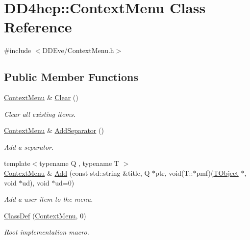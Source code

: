 \hypertarget{class_d_d4hep_1_1_context_menu}{
\section{DD4hep::ContextMenu Class Reference}
\label{class_d_d4hep_1_1_context_menu}
}


{\ttfamily \#include $<$DDEve/ContextMenu.h$>$}\subsection*{Public Member Functions}
\begin{DoxyCompactItemize}
\item 
\hyperlink{class_d_d4hep_1_1_context_menu}{ContextMenu} \& \hyperlink{class_d_d4hep_1_1_context_menu_a6696f7477fe601dda441f5b8f409d97d}{Clear} ()
\begin{DoxyCompactList}\small\item\em Clear all existing items. \item\end{DoxyCompactList}\item 
\hyperlink{class_d_d4hep_1_1_context_menu}{ContextMenu} \& \hyperlink{class_d_d4hep_1_1_context_menu_a4f500b58c95613e4b6a05a1b31d03a99}{AddSeparator} ()
\begin{DoxyCompactList}\small\item\em Add a separator. \item\end{DoxyCompactList}\item 
{\footnotesize template$<$typename Q , typename T $>$ }\\\hyperlink{class_d_d4hep_1_1_context_menu}{ContextMenu} \& \hyperlink{class_d_d4hep_1_1_context_menu_a7f3cd5ff904b8af781d686ff7de8219d}{Add} (const std::string \&title, Q $\ast$ptr, void(T::$\ast$pmf)(\hyperlink{class_t_object}{TObject} $\ast$, void $\ast$ud), void $\ast$ud=0)
\begin{DoxyCompactList}\small\item\em Add a user item to the menu. \item\end{DoxyCompactList}\item 
\hyperlink{class_d_d4hep_1_1_context_menu_a2f6ab4ffe0c386047b6922c267e0fba7}{ClassDef} (\hyperlink{class_d_d4hep_1_1_context_menu}{ContextMenu}, 0)
\begin{DoxyCompactList}\small\item\em Root implementation macro. \item\end{DoxyCompactList}\end{DoxyCompactItemize}
